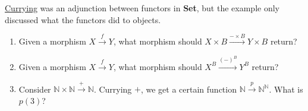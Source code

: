 \hyperref[X3.72]{Currying} was an adjunction between functors in \textbf{Set}, but the example only discussed what the functors did to objects.
    \begin{enumerate}
      \item Given a morphism $X \xrightarrow{f}Y$, what morphism should $X \times B \xrightarrow{-\times B}Y\times B$ return?
      \item Given a morphism $X \xrightarrow{f}Y$, what morphism should $X^ B \xrightarrow{(-)^B}Y^B$ return?
      \item Consider $\mathbb{N}\times \mathbb{N}\xrightarrow{+}\mathbb{N}$. Currying $+$, we get a certain function $\mathbb{N}\xrightarrow{p}\mathbb{N}^\mathbb{N}$. What is $p(3)$?
    \end{enumerate}